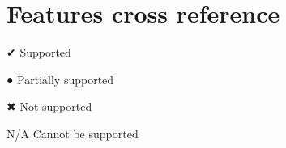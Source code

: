 \chapter{Features cross reference}
\hypertarget{md__c_1_2_users_2gallo_2_one_drive_2_documents_2_s_a_x_c3_x_a9-casali_2www_2wp-content_2plugins_266e221b4125e06c31da2fc107ac6d5e}{}\label{md__c_1_2_users_2gallo_2_one_drive_2_documents_2_s_a_x_c3_x_a9-casali_2www_2wp-content_2plugins_266e221b4125e06c31da2fc107ac6d5e}
\label{md__c_1_2_users_2gallo_2_one_drive_2_documents_2_s_a_x_c3_x_a9-casali_2www_2wp-content_2plugins_266e221b4125e06c31da2fc107ac6d5e_autotoc_md274}%
%



\begin{DoxyItemize}
\item ✔ Supported
\item ● Partially supported
\item ✖ Not supported
\item N/A Cannot be supported
\end{DoxyItemize}

